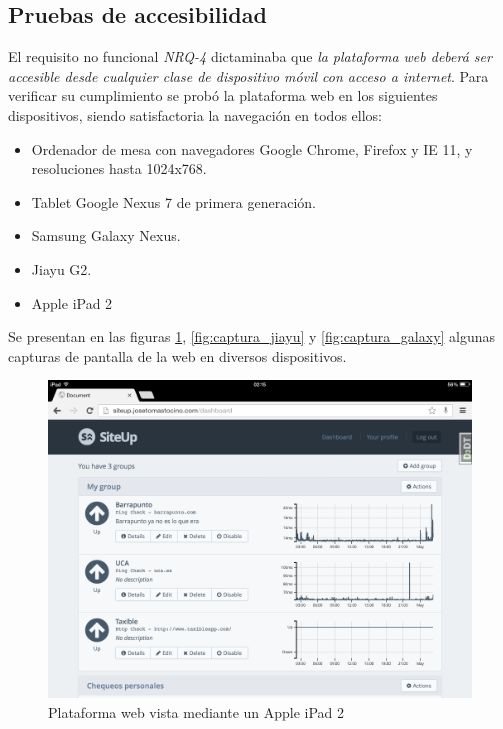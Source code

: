 \subsection{Pruebas de accesibilidad}

El requisito no funcional \textit{NRQ-4} dictaminaba que \textit{la plataforma
  web deberá ser accesible desde cualquier clase de dispositivo móvil con acceso
  a internet}. Para verificar su cumplimiento se probó la plataforma web en los
siguientes dispositivos, siendo satisfactoria la navegación en todos ellos:

\begin{itemize}
\item Ordenador de mesa con navegadores Google Chrome, Firefox y IE 11, y
  resoluciones hasta 1024x768.
\item Tablet Google Nexus 7 de primera generación.
\item Samsung Galaxy Nexus.
\item Jiayu G2.
\item Apple iPad 2
\end{itemize}

Se presentan en las figuras \ref{fig:captura_ipad}, \ref{fig:captura_jiayu} y
\ref{fig:captura_galaxy} algunas capturas de pantalla de la web en diversos
dispositivos.

\begin{figure}[hbtp]
  \centering
  \includegraphics[width=\textwidth]{7_pruebas/captura_ipad}
  \caption{Plataforma web vista mediante un Apple iPad 2}
  \label{fig:captura_ipad}
\end{figure}


